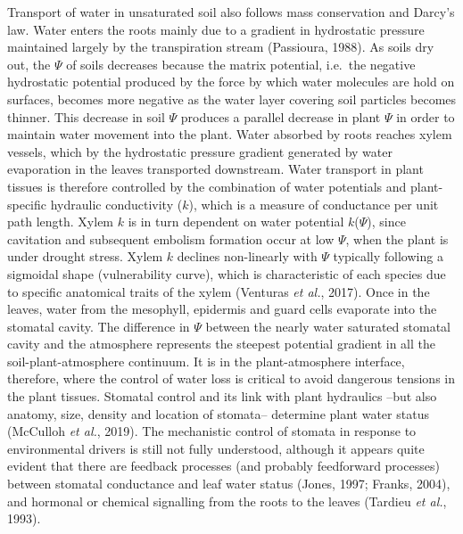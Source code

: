 \documentclass[11pt,twoside]{reedthesis}
\begin{document}
Transport of water in unsaturated soil also follows mass conservation
and Darcy's law. Water enters the roots mainly due to a gradient in
hydrostatic pressure maintained largely by the transpiration stream
(Passioura, 1988). As soils dry out, the \(\Psi\) of soils decreases
because the matrix potential, i.e.~the negative hydrostatic potential
produced by the force by which water molecules are hold on surfaces,
becomes more negative as the water layer covering soil particles becomes
thinner. This decrease in soil \(\Psi\) produces a parallel decrease in
plant \(\Psi\) in order to maintain water movement into the plant. Water
absorbed by roots reaches xylem vessels, which by the hydrostatic
pressure gradient generated by water evaporation in the leaves
transported downstream. Water transport in plant tissues is therefore
controlled by the combination of water potentials and plant-specific
hydraulic conductivity (\(k\)), which is a measure of conductance per
unit path length. Xylem \(k\) is in turn dependent on water potential
\(k\)(\(\Psi\)), since cavitation and subsequent embolism formation
occur at low \(\Psi\), when the plant is under drought stress. Xylem
\(k\) declines non-linearly with \(\Psi\) typically following a
sigmoidal shape (vulnerability curve), which is characteristic of each
species due to specific anatomical traits of the xylem (Venturas
\emph{et al.}, 2017). Once in the leaves, water from the mesophyll,
epidermis and guard cells evaporate into the stomatal cavity. The
difference in \(\Psi\) between the nearly water saturated stomatal
cavity and the atmosphere represents the steepest potential gradient in
all the soil-plant-atmosphere continuum. It is in the plant-atmosphere
interface, therefore, where the control of water loss is critical to
avoid dangerous tensions in the plant tissues. Stomatal control and its
link with plant hydraulics --but also anatomy, size, density and
location of stomata-- determine plant water status (McCulloh \emph{et
al.}, 2019). The mechanistic control of stomata in response to
environmental drivers is still not fully understood, although it appears
quite evident that there are feedback processes (and probably
feedforward processes) between stomatal conductance and leaf water
status (Jones, 1997; Franks, 2004), and hormonal or chemical signalling
from the roots to the leaves (Tardieu \emph{et al.}, 1993).\par
\end{document}
